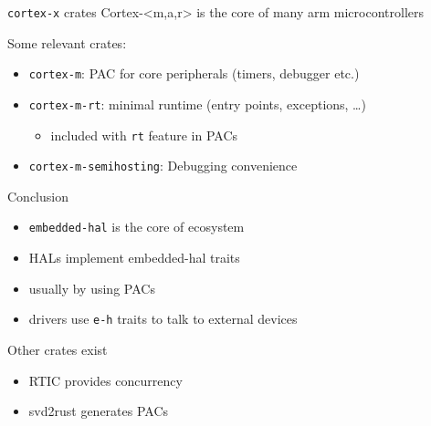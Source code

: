 \documentclass[aspectratio=169]{beamer}
\begin{document}
\begin{frame}{\texttt{cortex-x} crates}
    Cortex-<m,a,r> is the core of many arm microcontrollers

    Some relevant crates:
    \begin{itemize}
        \item \texttt{cortex-m}: PAC for core peripherals (timers, debugger etc.)
        \item \texttt{cortex-m-rt}: minimal runtime (entry points, exceptions, \dots)
            \begin{itemize}\item included with \texttt{rt} feature in PACs\end{itemize}
        \item \texttt{cortex-m-semihosting}: Debugging convenience
    \end{itemize}
\end{frame}

\begin{frame}{Conclusion}
     {
        \begin{itemize}
            \item \texttt{embedded-hal} is the core of ecosystem
            \item HALs implement embedded-hal traits
            \item usually by using PACs
            \item drivers use \texttt{e-h} traits to talk to external devices
        \end{itemize}
    }
     {
        Other crates exist
        \begin{itemize}
            \item{RTIC provides concurrency}
            \item{svd2rust generates PACs}
        \end{itemize}
    }
\end{frame}
\end{document}
